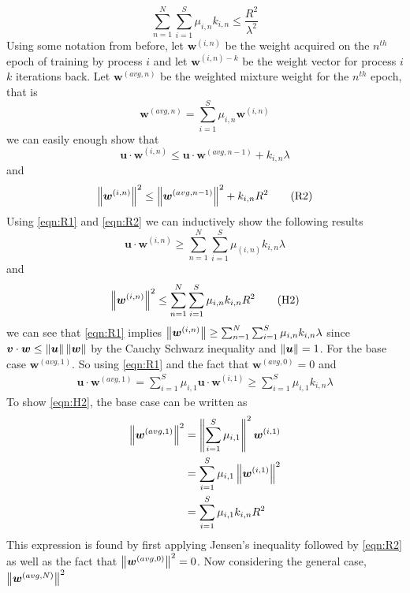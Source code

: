 \[
    \sum_{n=1}^{N} \sum_{i=1}^{S} \mu_{i,n} k_{i,n} \leq \frac{R^{2}}{\lambda^2}
\]
Using some notation from before, let $\bm{w}^{(i,n)}$ be the weight acquired on the $n^{th}$ epoch of training by process $i$ and let $\bm{w}^{(i,n)-k}$ be the weight vector for process $i$ $k$ iterations back. Let $\bm{w}^{(avg,n)}$ be the weighted mixture weight for the $n^{th}$ epoch, that is
\[
    \bm{w}^{(avg,n)} = \sum_{i=1}^{S} \mu_{i,n} \bm{w}^{(i,n)}
\]
we can easily enough show that
\begin{equation}
    \label{eqn:R1}
    \bm{u} \cdot \bm{w}^{(i,n)} \leq \bm{u} \cdot \bm{w}^{(avg,n-1)} + k_{i,n} \lambda \tag{R1}
\end{equation}
and
\begin{equation}
    \label{eqn:R2}
    \left\lVert\bm{w}^{(i,n)}\right\rVert^2 \leq \left\lVert\bm{w}^{(avg,n-1)}\right\rVert^2 + k_{i,n} R^2 \tag{R2}
\end{equation}
Using \ref{eqn:R1} and \ref{eqn:R2} we can inductively show the following results
\begin{equation}
    \label{eqn:H1}
    \bm{u} \cdot \bm{w}^{(i,n)} \geq \sum_{n=1}^{N} \sum_{i=1}^{S} \mu_{(i,n)} k_{i,n} \lambda \tag{H1}
\end{equation}
and
\begin{equation}
    \label{eqn:H2}
    \left\lVert\bm{w}^{(i,n)}\right\rVert^2 \leq \sum_{n=1}^{N} \sum_{i=1}^{S} \mu_{i,n} k_{i,n} R^2 \tag{H2}
\end{equation}
we can see that \ref{eqn:R1} implies $\left\lVert\bm{w}^{(i,n)}\right\rVert \geq \sum_{n=1}^{N} \sum_{i=1}^{S} \mu_{i,n} k_{i,n} \lambda$ since $\bm{v} \cdot \bm{w} \leq \left\lVert\bm{u}\right\rVert \left\lVert\bm{w}\right\rVert$ by the Cauchy Schwarz inequality and $\left\lVert\bm{u}\right\rVert = 1$. For the base case $\bm{w}^{(avg,1)}$. So using \ref{eqn:R1} and the fact that $\bm{w}^{(avg,0)} = 0$ and
\begin{align*}
    \bm{u} \cdot \bm{w}^{(avg,1)} = \sum_{i=1}^{S} \mu_{i,1} \bm{u} \cdot \bm{w}^{(i,1)} \geq \sum_{i=1}^{S} \mu_{i,1}  k_{i,n} \lambda
\end{align*}
To show \ref{eqn:H2}, the base case can be written as
\begin{align*}
    \left\lVert\bm{w}^{(avg,1)}\right\rVert^2 &= \left\lVert\sum_{i=1}^{S} \mu_{i,1}\right\rVert^2 \bm{w}^{(i,1)} \\
    &= \sum_{i=1}^{S} \mu_{i,1} \left\lVert\bm{w}^{(i,1)}\right\rVert^{2} \\
    &= \sum_{i=1}^{S} \mu_{i,1} k_{i,n} R^2
\end{align*}
This expression is found by first applying Jensen's inequality followed by \ref{eqn:R2} as well as the fact that $\left\lVert\bm{w}^{(avg,0)}\right\rVert^2 = 0$. Now considering the general case, $\left\lVert\bm{w}^{(avg,N)}\right\rVert^2$
